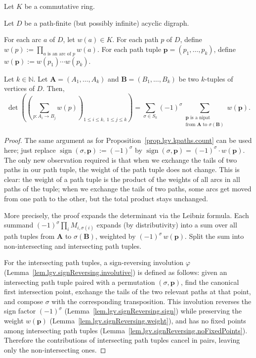 \begin{theorem}
\label{thm.lgv.kpaths.wt-dg}
\leantarget
\leanok
Let $K$ be a commutative ring.

Let $D$ be a path-finite (but possibly infinite) acyclic digraph.

For each arc $a$ of $D$, let $w(a) \in K$. For each path $p$ of $D$,
define $w(p) := \prod_{a \text{ is an arc of } p} w(a)$.
For each path tuple $\mathbf{p} = (p_1, \ldots, p_k)$, define
$w(\mathbf{p}) := w(p_1) \cdots w(p_k)$.

Let $k \in \mathbb{N}$.  Let
$\mathbf{A} = (A_1, \ldots, A_k)$ and
$\mathbf{B} = (B_1, \ldots, B_k)$ be two $k$-tuples of vertices of $D$.
Then,
\[
  \det\!\left(\left(\sum_{p : A_i \to B_j} w(p)\right)_{1 \le i \le k,\; 1 \le j \le k}\right)
  = \sum_{\sigma \in S_k} (-1)^{\sigma}
    \sum_{\substack{\mathbf{p} \text{ is a nipat} \\ \text{from } \mathbf{A} \text{ to } \sigma(\mathbf{B})}}
    w(\mathbf{p}).
\]
\end{theorem}

\begin{proof}
The same argument as for
Proposition~\ref{prop.lgv.kpaths.count} can be used here; just replace
$\operatorname{sign}(\sigma, \mathbf{p}) := (-1)^{\sigma}$ by
$\operatorname{sign}(\sigma, \mathbf{p}) = (-1)^{\sigma} \cdot w(\mathbf{p})$.
The only new observation required is that when we exchange the tails of
two paths in our path tuple, the weight of the path tuple does not change.
This is clear: the weight of a path tuple is the product of the weights of
all arcs in all paths of the tuple; when we exchange the tails of two paths,
some arcs get moved from one path to the other, but the total product stays
unchanged.

More precisely, the proof expands the determinant via the Leibniz formula.
Each summand $(-1)^\sigma \prod_i M_{i,\sigma(i)}$ expands (by
distributivity) into a sum over all path tuples from $\mathbf{A}$ to
$\sigma(\mathbf{B})$, weighted by $(-1)^\sigma \, w(\mathbf{p})$.  Split
the sum into non-intersecting and intersecting path tuples.

For the intersecting path tuples, a sign-reversing involution
$\varphi$ (Lemma~\ref{lem.lgv.signReversing.involutive}) is defined as
follows: given an intersecting path tuple paired with a permutation
$(\sigma, \mathbf{p})$, find the canonical first intersection point,
exchange the tails of the two relevant paths at that point, and compose
$\sigma$ with the corresponding transposition.  This involution
reverses the sign factor $(-1)^\sigma$ (Lemma~\ref{lem.lgv.signReversing.sign})
while preserving the weight $w(\mathbf{p})$
(Lemma~\ref{lem.lgv.signReversing.weight}), and has no fixed points
among intersecting path tuples
(Lemma~\ref{lem.lgv.signReversing.noFixedPoints}).  Therefore the
contributions of intersecting path tuples cancel in pairs, leaving only
the non-intersecting ones.
\end{proof}

